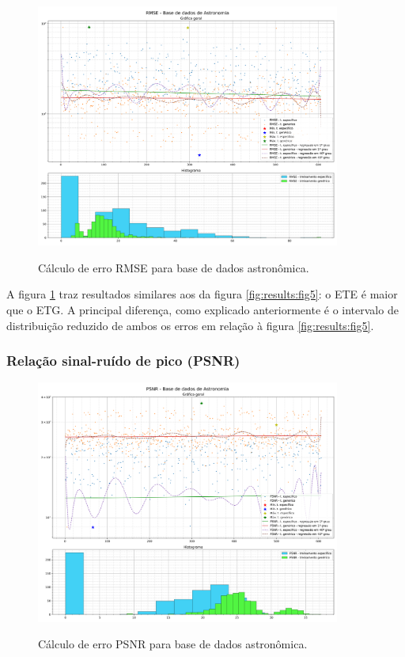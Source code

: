 \begin{figure}[H]
    \centering
    \caption{Cálculo de erro RMSE para base de dados astronômica.}
    \includegraphics[width=10cm]{fig/resultados/astronomy/png/rmse_astronomy_compound.png}
    \label{fig:results:fig6}
\end{figure}

A figura \ref{fig:results:fig6} traz resultados similares aos da figura \ref{fig:results:fig5}: o ETE é maior que o ETG. A principal diferença, como explicado anteriormente é o intervalo de distribuição reduzido de ambos os erros em relação à figura \ref{fig:results:fig5}.

\subsubsection{Relação sinal-ruído de pico (PSNR)}
\label{sec:result:astronomy:psnr}

\begin{figure}[H]
    \centering
    \caption{Cálculo de erro PSNR para base de dados astronômica.}
    \includegraphics[width=10cm]{fig/resultados/astronomy/png/psnr_astronomy_compound.png}
    \label{fig:results:fig7}
\end{figure}

